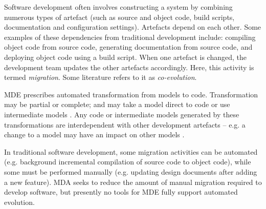 Software development often involves constructing a system by combining numerous types of artefact (such as source and object code, build scripts, documentation and configuration settings). Artefacts depend on each other. Some examples of these dependencies from traditional development include: compiling object code from source code, generating documentation from source code, and deploying object code using a build script. When one artefact is changed, the development team updates the other artefacts accordingly. Here, this activity is termed \textit{migration}. Some literature refers to it as \textit{co-evolution}.

MDE prescribes automated transformation from models to code. Transformation may be partial or complete; and may take a model direct to code or use intermediate models \cite{kleppe03mda}. Any code or intermediate models generated by these transformations are interdependent with other development artefacts -- e.g. a change to a model may have an impact on other models \cite{deursen07mdse}.

In traditional software development, some migration activities can be automated (e.g. background incremental compilation of source code to object code), while some must be performed manually (e.g. updating design documents after adding a new feature). MDA seeks to reduce the amount of manual migration required to develop software, but presently no tools for MDE fully support automated evolution.